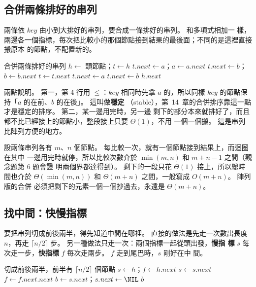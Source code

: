 \subsection{合併兩條排好的串列}

兩條依 $\mathit{key}$ 由小到大排好的串列，要合成一條排好的串列。 和多項式相加一
樣，兩邊各一個指標，每次把比較小的那個節點接到結果的最後面；不同的是這裡直接搬原本
的節點，不配置新的。

\begin{pseudo}[label=alg:ll-merge]{合併兩條排好的串列}
    \State $h \gets$ 頭節點；$t \gets h$
            \State $t.\mathit{next} \gets a$；$a \gets a.\mathit{next}$
        \Else
            \State $t.\mathit{next} \gets b$；$b \gets b.\mathit{next}$
        \EndIf
        \State $t \gets t.\mathit{next}$
    \EndWhile
        \State $t.\mathit{next} \gets a$ 
    \Else
        \State $t.\mathit{next} \gets b$
    \EndIf
    \State \Return $h.\mathit{next}$
\EndFunction
\end{pseudo}

兩點說明。 第一，第 4 行用 $\le$：$\mathit{key}$ 相同時先拿 $a$ 的，所以同樣
$\mathit{key}$ 的節點保持「$a$ 的在前、$b$ 的在後」。 這叫做\textbf{穩定}
（stable），第~14~章的合併排序靠這一點才是穩定的排序。 第二，某一邊用完時，另一邊
剩下的部分本來就排好了，而且都不比已經接上的節點小，整段接上只要 $\Theta(1)$，不用
一個一個搬。 這是串列比陣列方便的地方。

設兩條串列各有 $m$、$n$ 個節點。 每比較一次，就有一個節點接到結果上，而迴圈在其中
一邊用完時就停，所以比較次數介於 $\min(m, n)$ 和 $m + n - 1$ 之間（觀念題第 6 題會證
明兩個界都達得到）。 剩下的一段只花 $\Theta(1)$ 接上，所以總時間也介於
$\Theta(\min(m, n))$ 和 $\Theta(m + n)$ 之間，一般寫成 $O(m + n)$。 陣列版的合併
必須把剩下的元素一個一個抄過去，永遠是 $\Theta(m + n)$。

\subsection{找中間：快慢指標}

要把串列切成前後兩半，得先知道中間在哪裡。 直接的做法是先走一次數出長度 $n$，再走
$\lceil n/2 \rceil$ 步。 另一種做法只走一次：兩個指標一起從頭出發，\textbf{慢指
標} $s$ 每次走一步，\textbf{快指標} $f$ 每次走兩步。 $f$ 走到尾巴時，$s$ 剛好在中
間。

\begin{pseudo}[label=alg:ll-split]{切成前後兩半，前半有 $\lceil n/2 \rceil$ 個節點}
        \State \Return \NIL
    \EndIf
    \State $s \gets h$；$f \gets h.\mathit{next}$
        \State $s \gets s.\mathit{next}$
        \State $f \gets f.\mathit{next}.\mathit{next}$
    \EndWhile
    \State $b \gets s.\mathit{next}$；$s.\mathit{next} \gets \NIL$
    \State \Return $b$ 
\EndFunction
\end{pseudo}

